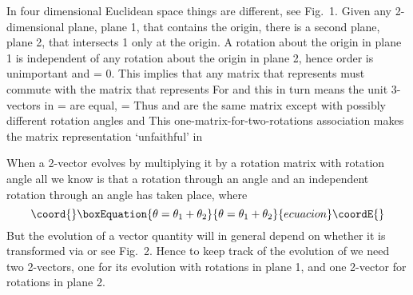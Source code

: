 \documentclass[a4paper,12pt]{article}
\begin{document}
	\coordHE{} In  four dimensional Euclidean space \coordHE{} things are different, see Fig.~1. Given any 2-dimensional plane, plane 1, that contains the origin, there is a second plane, plane 2, that intersects 1 only at the origin. A rotation \coordHE{} about the origin in plane 1 is independent of any rotation \coordHE{} about the origin in plane 2, hence order is unimportant and \coordHE{}  \coordHE{} = 0. This implies that any matrix \coordHE{} that represents \coordHE{} must commute with the matrix \coordHE{} that represents \coordHE{} For \coordHE{} and \coordHE{} this in turn means the unit 3-vectors \coordHE{} in \coordHE{} = \coordHE{} are equal, \coordHE{} = \coordHE{} Thus \coordHE{} and \coordHE{} are the same matrix except with possibly different rotation angles \coordHE{} and \coordHE{} This one-matrix-for-two-rotations association makes the \coordHE{} matrix representation `unfaithful' in \coordHE{}

	When a 2-vector \coordHE{} evolves by multiplying it by a rotation matrix \coordHE{} with rotation angle \myHighlight{$\theta,$}\coordHE{} all we know is that a rotation \coordHE{} through an angle \coordHE{} and an independent rotation \coordHE{} through an angle \coordHE{} has taken place, where
\begin{equation}\coord{}\boxEquation{	\label{1+2}
\theta = \theta_{1} + \theta_{2}
}{	\theta = \theta_{1} + \theta_{2}
}{ecuacion}\coordE{}\end{equation}
But the evolution of a vector quantity \myHighlight{$\chi$}\coordHE{} will in general depend on whether it is transformed via \coordHE{} or \coordHE{} see Fig.~2. Hence to keep track of the evolution of \myHighlight{$\chi$}\coordHE{} we need two 2-vectors, one for its evolution with rotations in plane 1, and one 2-vector for rotations in plane 2. 
\end{document}
